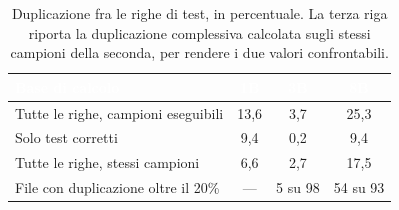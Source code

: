\begin{table}[H]
\centering
\caption{Duplicazione fra le righe di test, in percentuale. La terza riga
riporta la duplicazione complessiva calcolata sugli stessi campioni della
seconda, per rendere i due valori confrontabili.}
\label{tab:duplicazione}
\begin{tabular}{lccc}
\hline
\rowcolor{intest}
\textcolor{white}{\textbf{Base di calcolo}} & \textcolor{white}{\textbf{1B}} &
\textcolor{white}{\textbf{3B}} & \textcolor{white}{\textbf{8B}} \\
\hline
Tutte le righe, campioni eseguibili     & 13,6 & 3,7 & 25,3 \\
Solo test corretti                      &  9,4 & 0,2 &  9,4 \\
Tutte le righe, stessi campioni         &  6,6 & 2,7 & 17,5 \\
\hline
\rowcolor{accento}
File con duplicazione oltre il 20\%     & --- & 5 su 98 & 54 su 93 \\
\hline
\end{tabular}
\end{table}


